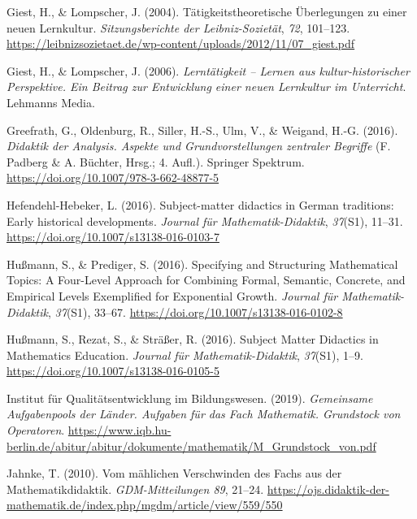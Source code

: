 \documentclass[
]{scrbook}
\newlength{\cslhangindent}
\newlength{\cslentryspacingunit} %
\newenvironment{CSLReferences}[2] %
 {%
  \setlength{\parindent}{0pt}
  \ifodd #1
  \let\oldpar\par
  \def\par{\hangindent=\cslhangindent\oldpar}
  \fi
  \setlength{\parskip}{#2\cslentryspacingunit}
 }%
 {}
\theoremstyle{definition}
\theoremstyle{definition}
\theoremstyle{definition}
\theoremstyle{definition}
\theoremstyle{remark}
\begin{document}
\begin{CSLReferences}{1}{0}
\leavevmode{}%
Giest, H., \& Lompscher, J. (2004). Tätigkeitstheoretische Überlegungen zu einer neuen {Lernkultur}. \emph{Sitzungsberichte der Leibniz-Sozietät}, \emph{72}, 101--123. \url{https://leibnizsozietaet.de/wp-content/uploads/2012/11/07_giest.pdf}

\leavevmode{}%
Giest, H., \& Lompscher, J. (2006). \emph{Lerntätigkeit -- {Lernen} aus kultur-historischer {Perspektive}. {Ein} {Beitrag} zur {Entwicklung} einer neuen {Lernkultur} im {Unterricht}}. Lehmanns Media.

\leavevmode{}%
Greefrath, G., Oldenburg, R., Siller, H.-S., Ulm, V., \& Weigand, H.-G. (2016). \emph{Didaktik der {Analysis}. {Aspekte} und {Grundvorstellungen} zentraler {Begriffe}} (F. Padberg \& A. Büchter, Hrsg.; 4. Aufl.). Springer Spektrum. \url{https://doi.org/10.1007/978-3-662-48877-5}

\leavevmode{}%
Hefendehl-Hebeker, L. (2016). Subject-matter didactics in {German} traditions: {Early} historical developments. \emph{Journal für Mathematik-Didaktik}, \emph{37}(S1), 11--31. \url{https://doi.org/10.1007/s13138-016-0103-7}

\leavevmode{}%
Hußmann, S., \& Prediger, S. (2016). Specifying and Structuring Mathematical Topics: A Four-Level Approach for Combining Formal, Semantic, Concrete, and Empirical Levels Exemplified for Exponential Growth. \emph{Journal für Mathematik-Didaktik}, \emph{37}(S1), 33--67. \url{https://doi.org/10.1007/s13138-016-0102-8}

\leavevmode{}%
Hußmann, S., Rezat, S., \& Sträßer, R. (2016). Subject {Matter} {Didactics} in {Mathematics} {Education}. \emph{Journal für Mathematik-Didaktik}, \emph{37}(S1), 1--9. \url{https://doi.org/10.1007/s13138-016-0105-5}

\leavevmode{}%
Institut für Qualitätsentwicklung im Bildungswesen. (2019). \emph{Gemeinsame {Aufgabenpools} der {Länder}. {Aufgaben} für das {Fach} {Mathematik}. {Grundstock} von {Operatoren}}. \url{https://www.iqb.hu-berlin.de/abitur/abitur/dokumente/mathematik/M_Grundstock_von.pdf}

\leavevmode{}%
Jahnke, T. (2010). Vom mählichen {Verschwinden} des {Fachs} aus der {Mathematikdidaktik}. \emph{GDM-Mitteilungen 89}, 21--24. \url{https://ojs.didaktik-der-mathematik.de/index.php/mgdm/article/view/559/550}


\end{CSLReferences}
\end{document}

